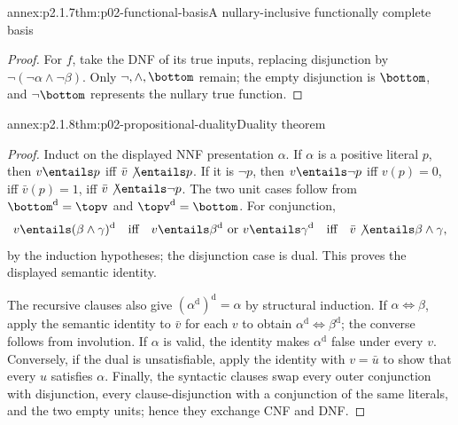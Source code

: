 \begin{annexitem}{annex:p2.1.7}{thm:p02-functional-basis}{A nullary-inclusive functionally complete basis}
\begin{proof}
For \(f\), take the DNF of its true inputs, replacing disjunction by
\(\neg(\neg\alpha\land\neg\beta)\).  Only \(\neg,\land,\bottom\) remain;
the empty disjunction is \(\bottom\), and \(\neg\bottom\) represents the
nullary true function.
\end{proof}
\end{annexitem}

\begin{annexitem}{annex:p2.1.8}{thm:p02-propositional-duality}{Duality theorem}
\begin{proof}
Induct on the displayed NNF presentation \(\alpha\).  If \(\alpha\) is a
positive literal \(p\), then
\(v\entails p\) iff \(\bar v\not\entails p\).  If it is \(\neg p\), then
\(v\entails\neg p\) iff \(v(p)=0\), iff
\(\bar v(p)=1\), iff \(\bar v\not\entails\neg p\).  The two unit
cases follow from \(\bottom^{\mathrm d}=\topv\) and
\(\topv^{\mathrm d}=\bottom\).  For conjunction,
\[
 v\entails(\beta\land\gamma)^{\mathrm d}
 \quad\text{iff}\quad
 v\entails\beta^{\mathrm d}\text{ or }v\entails\gamma^{\mathrm d}
 \quad\text{iff}\quad
 \bar v\not\entails\beta\land\gamma,
\]
by the induction hypotheses; the disjunction case is dual.  This proves the
displayed semantic identity.

The recursive clauses also give \((\alpha^{\mathrm d})^{\mathrm d}=\alpha\)
by structural induction.  If \(\alpha\Leftrightarrow\beta\), apply the
semantic identity to \(\bar v\) for each \(v\) to obtain
\(\alpha^{\mathrm d}\Leftrightarrow\beta^{\mathrm d}\); the converse follows
from involution.  If \(\alpha\) is valid, the identity makes
\(\alpha^{\mathrm d}\) false under every \(v\).  Conversely, if the dual is
unsatisfiable, apply the identity with \(v=\bar u\) to show that every \(u\)
satisfies \(\alpha\).  Finally, the syntactic clauses swap every outer
conjunction with disjunction, every clause-disjunction with a conjunction of
the same literals, and the two empty units; hence they exchange CNF and DNF.
\end{proof}
\end{annexitem}
